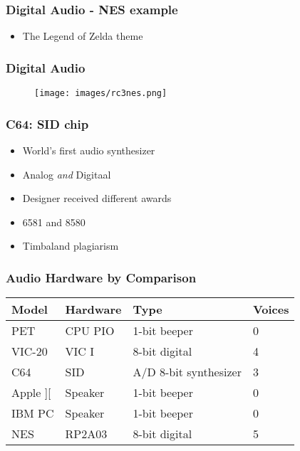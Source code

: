 \documentclass[aspectratio=43]{uva-inf-presentation}
\begin{document}

\begin{frame}
\frametitle{Digital Audio - NES example}

\begin{itemize}
\item The Legend of Zelda theme
\end{itemize}

\end{frame}


\begin{frame}
\frametitle{Digital Audio}

\begin{figure}
\texttt{[image: images/rc3nes.png]}
\end{figure}

\end{frame}


\begin{frame}
\frametitle{C64: SID chip}

\begin{itemize}
\item World's first audio synthesizer
\item Analog \emph{and} Digitaal
\item Designer received different awards
\item 6581 and 8580
\item Timbaland plagiarism
\end{itemize}

\end{frame}


\begin{frame}
\frametitle{Audio Hardware by Comparison}

\begin{tabular}{|l|l|l|l|}
\hline Model & Hardware & Type & Voices \\ \hline
PET & CPU PIO & 1-bit beeper & 0 \\
VIC-20 & VIC I & 8-bit digital & 4 \\
C64 & SID & A/D 8-bit synthesizer & 3 \\ \hline
Apple ][ & Speaker & 1-bit beeper & 0 \\
IBM PC & Speaker & 1-bit beeper & 0 \\
NES & RP2A03 & 8-bit digital & 5 \\ \hline
\end{tabular}

\end{frame}
\end{document}
